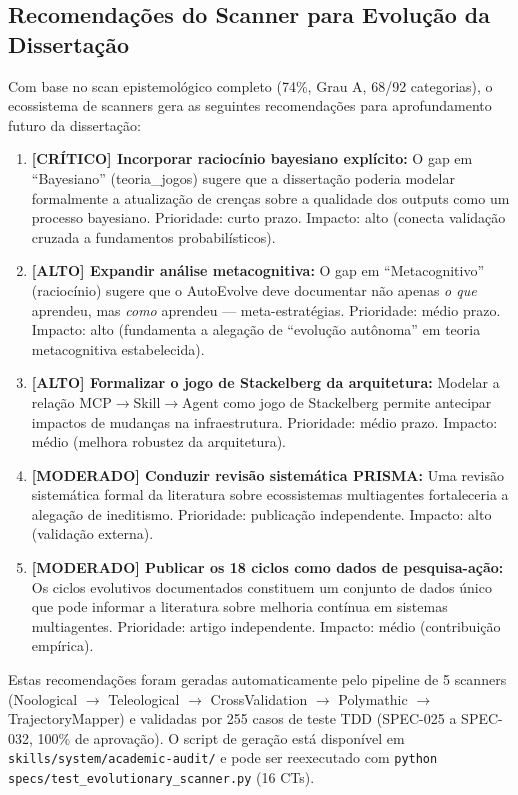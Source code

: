 \subsection{Recomendações do Scanner para Evolução da Dissertação}

Com base no scan epistemológico completo (74\%, Grau A, 68/92 categorias), o ecossistema de scanners gera as seguintes recomendações para aprofundamento futuro da dissertação:

\begin{enumerate}
  \item \textbf{[CRÍTICO] Incorporar raciocínio bayesiano explícito:} O gap em ``Bayesiano'' (teoria\_jogos) sugere que a dissertação poderia modelar formalmente a atualização de crenças sobre a qualidade dos outputs como um processo bayesiano. Prioridade: curto prazo. Impacto: alto (conecta validação cruzada a fundamentos probabilísticos).
  
  \item \textbf{[ALTO] Expandir análise metacognitiva:} O gap em ``Metacognitivo'' (raciocínio) sugere que o AutoEvolve deve documentar não apenas \textit{o que} aprendeu, mas \textit{como} aprendeu --- meta-estratégias. Prioridade: médio prazo. Impacto: alto (fundamenta a alegação de ``evolução autônoma'' em teoria metacognitiva estabelecida).
  
  \item \textbf{[ALTO] Formalizar o jogo de Stackelberg da arquitetura:} Modelar a relação MCP$\rightarrow$Skill$\rightarrow$Agent como jogo de Stackelberg permite antecipar impactos de mudanças na infraestrutura. Prioridade: médio prazo. Impacto: médio (melhora robustez da arquitetura).
  
  \item \textbf{[MODERADO] Conduzir revisão sistemática PRISMA:} Uma revisão sistemática formal da literatura sobre ecossistemas multiagentes fortaleceria a alegação de ineditismo. Prioridade: publicação independente. Impacto: alto (validação externa).
  
  \item \textbf{[MODERADO] Publicar os 18 ciclos como dados de pesquisa-ação:} Os ciclos evolutivos documentados constituem um conjunto de dados único que pode informar a literatura sobre melhoria contínua em sistemas multiagentes. Prioridade: artigo independente. Impacto: médio (contribuição empírica).
\end{enumerate}

Estas recomendações foram geradas automaticamente pelo pipeline de 5 scanners (Noological $\rightarrow$ Teleological $\rightarrow$ CrossValidation $\rightarrow$ Polymathic $\rightarrow$ TrajectoryMapper) e validadas por 255 casos de teste TDD (SPEC-025 a SPEC-032, 100\% de aprovação). O script de geração está disponível em \texttt{skills/system/academic-audit/} e pode ser reexecutado com \texttt{python specs/test\_evolutionary\_scanner.py} (16 CTs).

